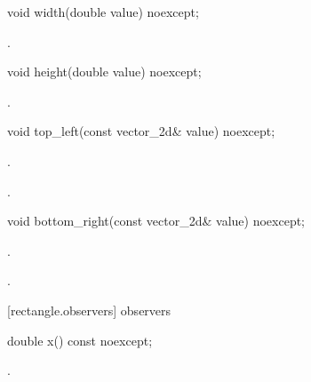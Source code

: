\begin{itemdecl}
void width(double value) noexcept;
\end{itemdecl}
\begin{itemdescr}
	\pnum
	\postconditions
	.

\end{itemdescr}

\begin{itemdecl}
void height(double value) noexcept;
\end{itemdecl}
\begin{itemdescr}
	\pnum
	\postconditions
	.

\end{itemdescr}

\begin{itemdecl}
void top_left(const vector_2d& value) noexcept;
\end{itemdecl}
\begin{itemdescr}
	\pnum
	\postconditions
	.
	
	\pnum
	.
	
\end{itemdescr}

\begin{itemdecl}
void bottom_right(const vector_2d& value) noexcept;
\end{itemdecl}
\begin{itemdescr}
	\pnum
	\postconditions
	.
	
	\pnum
	.
	
\end{itemdescr}

 [rectangle.observers]{ observers}

\begin{itemdecl}
double x() const noexcept;
\end{itemdecl}
\begin{itemdescr}
	\pnum
	\returns
	.

\end{itemdescr}

